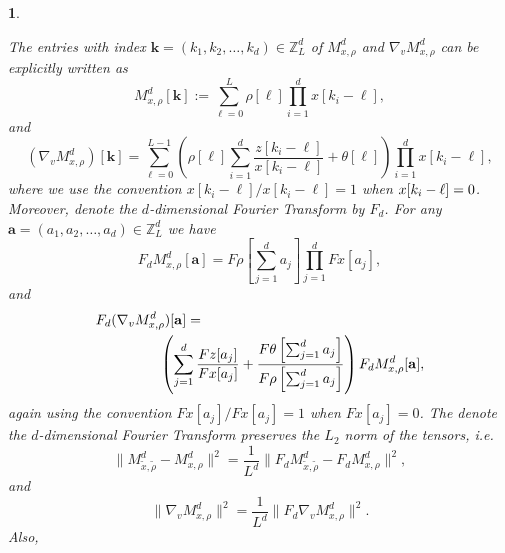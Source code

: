 \documentclass{IEEEtran}
\numberwithin{equation}{section}
\numberwithin{figure}{section}
\theoremstyle{plain}
\theoremstyle{definition}
\theoremstyle{remark}
\theoremstyle{plain}
\newtheorem{lem}[thm]{\protect\lemmaname}
\theoremstyle{remark}
\theoremstyle{plain}
\theoremstyle{plain}
\theoremstyle{remark}
\providecommand{\lemmaname}{Lemma}
\newcommand{\F}{F}
\newcommand{\Z}{{\mathbb{Z}}}
\newcommand{\kk}{{\mathbf{k}}}
\newcommand{\modminus}{-}
\def\aa{\mathbf{a}}
\begin{document}
\begin{lem}\label{lem:fourierautocorr}
	
	The entries with index $\kk=(k_1,k_2,\dots,k_d)\in \Z^d_L$ of $M^d_{x,\rho}$ and $\nabla_v M^d_{x,\rho}$ can be explicitly written as 
	\begin{equation}\label{eq:autocorrelation2}
	M^d_{x,\rho}[\kk]:=\sum _{\ell=0}^L \rho[\ell]\prod_{i=1}^d x[k_i\modminus \ell],
	\end{equation}
	and
	\begin{equation}\label{eq:dirautocorr2}
	(\nabla_v M^d_{x,\rho})[\kk]=\sum _{\ell=0}^{L-1}\left(\rho[\ell]\sum_{i=1}^d \frac{z[k_i\modminus \ell]}{x[k_i\modminus \ell]}+\theta[\ell]\right)\prod_{i=1}^d x[k_i\modminus \ell],
	\end{equation}
	where we use the convention $x[k_i\modminus \ell]/x[k_i\modminus \ell]=1$ when $\\x[k_i\modminus \ell]=0$. Moreover, denote the $d$-dimensional Fourier Transform by $\F_d$. For any $\aa=(a_1,a_2,\dots,a_d)\in \Z^d_L$ we have
	\begin{equation}\label{eq:FourierTransformA}
	\F_d M^d_{x,\rho}[\aa]=\F \rho\left[\sum_{j=1}^d a_j\right]\prod_{j=1}^d \F x[a_j],
	\end{equation}
	and
	\begin{align}\label{eq:FourierTransformvA}
	F_d (\nabla_v M^d_{x,\rho})[\aa]= \hspace{-30pt} &\\
	& \left(\sum_{j=1}^d \frac{Fz[a_j]}{Fx[a_j]}+\frac{F\theta\left[\sum_{j=1}^d a_j\right]}{F\rho\left[\sum_{j=1}^d a_j\right]}\right)\F_d M^d_{x,\rho}[\aa],
	\end{align}
	again using the convention $Fx[a_j]/Fx[a_j]=1$ when $Fx[a_j]=0$.
	The denote the $d$-dimensional Fourier Transform preserves the $L_2$ norm of the tensors, i.e.
	\begin{equation}\label{eq:fourierautounit}
	\|M^d_{\tilde x,\tilde \rho}-M^d_{x,\rho}\|^2=\frac{1}{L^d}\|\F_d M^d_{\tilde x,\tilde \rho}-\F_d M^d_{x,\rho}\|^2,
	\end{equation}
	and
	\begin{equation}\label{eq:fourierautounitdir}
	\|\nabla_v M^d_{x,\rho} \|^2=\frac{1}{L^d}\|\F_d\nabla_v M^d_{x,\rho} \|^2.
	\end{equation}
	Also, 
	
\end{lem}
\end{document}
